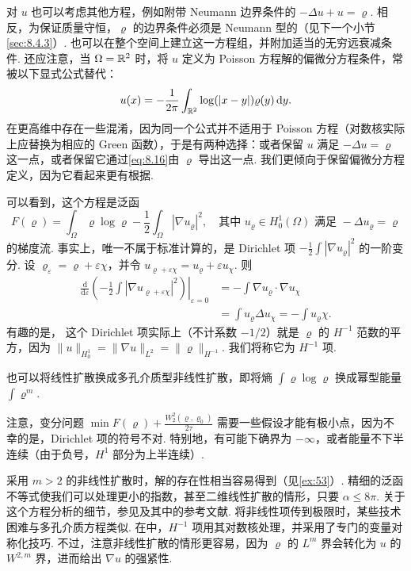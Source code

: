 对 $u$ 也可以考虑其他方程，例如附带 Neumann 边界条件的 $-\Delta u+u=\varrho$. 相反，为保证质量守恒，$\varrho$ 的边界条件必须是 Neumann 型的（见下一个小节\autoref{sec:8.4.3}）. 也可以在整个空间上建立这一方程组，并附加适当的无穷远衰减条件. 还应注意，当 $\Omega=\mathbb R^2$ 时，将 $u$ 定义为 Poisson 方程解的偏微分方程条件，常被以下显式公式替代：
\begin{equation}\label{eq:8.16}
u(x)=-\frac1{2\pi}\int_{\mathbb R^2}\log(|x-y|)\varrho(y)\,\mathrm d y.
\end{equation}
在更高维中存在一些混淆，因为同一个公式并不适用于 Poisson 方程（对数核实际上应替换为相应的 Green 函数），于是有两种选择：或者保留 $u$ 满足 $-\Delta u=\varrho$ 这一点，或者保留它通过\eqref{eq:8.16}由 $\varrho$ 导出这一点. 我们更倾向于保留偏微分方程定义，因为它看起来更有根据.

可以看到，这个方程是泛函
\[
F(\varrho)=\int_\Omega\varrho\log\varrho-\frac12\int_\Omega|\nabla u_\varrho|^2,
\quad\text{其中 }u_\varrho\in H_0^1(\Omega)\text{ 满足 }-\Delta u_\varrho=\varrho
\]
的梯度流. 事实上，唯一不属于标准计算的，是 Dirichlet 项 $-\frac12\int|\nabla u_\varrho|^2$ 的一阶变分. 设 $\varrho_\varepsilon=\varrho+\varepsilon\chi$，并令 $u_{\varrho+\varepsilon\chi}=u_\varrho+\varepsilon u_\chi$. 则
\[
\begin{aligned}
\left.\frac{\mathrm d}{\mathrm d\varepsilon}\left(-\frac12\int|\nabla u_{\varrho+\varepsilon\chi}|^2\right)\right|_{\varepsilon=0}
&=-\int\nabla u_\varrho\cdot\nabla u_\chi\\
&=\int u_\varrho\Delta u_\chi=-\int u_\varrho\chi.
\end{aligned}
\]
有趣的是，\label{idx:i1-p306}
这个 Dirichlet 项实际上（不计系数 $-1/2$）就是 $\varrho$ 的 $H^{-1}$ 范数的平方，因为 $\|u\|_{H_0^1}=\|\nabla u\|_{L^2}=\|\varrho\|_{H^{-1}}$. 我们将称它为 $H^{-1}$ 项.

也可以将线性扩散换成多孔介质型非线性扩散，即将熵 $\int\varrho\log\varrho$ 换成幂型能量 $\int\varrho^m$.

注意，变分问题 $\min F(\varrho)+\frac{W_2^2(\varrho,\varrho_0)}{2\tau}$ 需要一些假设才能有极小点，因为不幸的是，Dirichlet 项的符号不对. 特别地，有可能下确界为 $-\infty$，或者能量不下半连续（由于负号，$H^1$ 部分为上半连续）.

采用 $m>2$ 的非线性扩散时，解的存在性相当容易得到（见\autoref{ex:53}）. 精细的泛函不等式使我们可以处理更小的指数，甚至二维线性扩散的情形，只要 $\alpha\leq8\pi$. 关于这个方程分析的细节，参见\cite{b57}及其中的参考文献. 将非线性项传到极限时，某些技术困难与多孔介质方程类似. 在\cite{b57}中，$H^{-1}$ 项用其对数核处理，并采用了专门的变量对称化技巧. 不过，注意非线性扩散的情形更容易，因为 $\varrho$ 的 $L^m$ 界会转化为 $u$ 的 $W^{2,m}$ 界，进而给出 $\nabla u$ 的强紧性.

